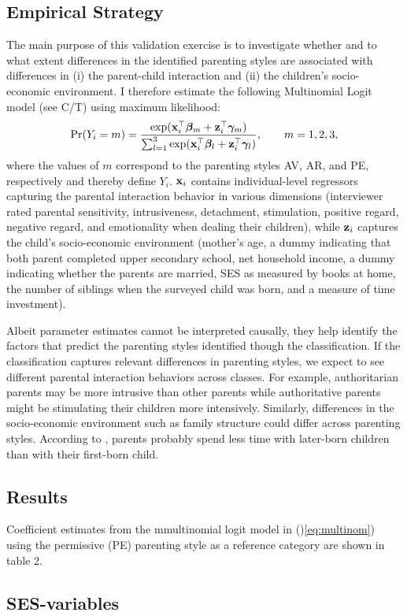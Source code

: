 \subsection{Empirical Strategy}
The main purpose of this validation exercise is to investigate whether and to what extent differences in the identified parenting styles are associated with differences in (i) the parent-child interaction and (ii) the children's socio-economic environment. I therefore estimate the following Multinomial Logit model
(see C/T) using maximum likelihood:
\begin{equation}
	\text{Pr}(Y_i = m) = \frac{\exp(\textbf{x}^\top_{i} \bm{\beta}_m + \textbf{z}^\top_{i} \bm{\gamma}_m)}{\sum_{l=1}^{3} \exp(\textbf{x}^\top_{i}\bm{\beta}_l + \textbf{z}^\top_{i} \bm{\gamma}_l)}, \qquad m = 1, 2, 3, \label{eq:multinom}
\end{equation}
where the values of $m$ correspond to the parenting styles AV, AR, and PE, respectively and thereby define $Y_i$. $\textbf{x}_i$ contains individual-level regressors capturing the parental interaction behavior in various dimensions (interviewer rated parental sensitivity, intrusiveness, detachment, stimulation, positive regard, negative regard, and emotionality when dealing their children), while $\textbf{z}_i$ captures the child's socio-economic environment (mother's age, a dummy indicating that both parent completed upper secondary school, net household income, a dummy indicating whether the parents are married, SES as measured by books at home, the number of siblings when the surveyed child was born, and a measure of time investment).

Albeit parameter estimates cannot be interpreted causally, they help identify the factors that predict the parenting styles identified though the classification. If the classification captures relevant differences in parenting styles, we expect to see different parental interaction behaviors across classes. For example, authoritarian parents may be more intrusive than other parents while authoritative parents might be stimulating their children more intensively. Similarly, differences in the socio-economic environment such as family structure could differ across parenting styles. According to \textcite{beckerTreatiseFamily1981}, parents probably spend less time with later-born children than with their first-born child.  

\subsection{Results}
Coefficient estimates from the mmultinomial logit model in ()\ref{eq:multinom}) using the permissive (PE) parenting style as a reference category are shown in table 2.  


\subsection{SES-variables}